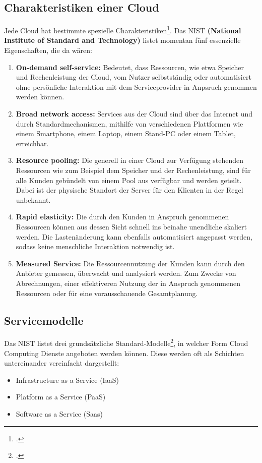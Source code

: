 \subsection{Charakteristiken einer Cloud}
Jede Cloud hat bestimmte spezielle Charakteristiken\footcite{cloud-computing}. Das NIST \textbf{(National Institute of Standard and Technology)} listet
momentan fünf essenzielle Eigenschaften, die da wären:
\begin{enumerate}
	\item \textbf{On-demand self-service: } Bedeutet, dass Ressourcen, wie etwa Speicher und Rechenleistung der Cloud, vom Nutzer selbstständig oder automatisiert 
ohne persönliche Interaktion mit dem Serviceprovider in Anpsruch genommen werden können.
	\item \textbf{Broad network access: } Services aus der Cloud sind über das Internet und durch Standardmechanismen, mithilfe von verschiedenen Plattformen wie einem Smartphone, einem Laptop, einem Stand-PC oder einem Tablet, erreichbar.
	\item \textbf{Resource pooling: } Die generell in einer Cloud zur Verfügung stehenden Ressourcen wie zum Beispiel dem Speicher und der Rechenleistung, sind für alle Kunden gebündelt von einem Pool aus verfügbar und werden geteilt. Dabei ist der physische Standort der Server für den Klienten in der Regel unbekannt.
	\item \textbf{Rapid elasticity: } Die durch den Kunden in Anspruch genommenen Ressourcen können aus dessen Sicht schnell ins beinahe unendliche skaliert werden. Die Lastenänderung
kann ebenfalls automatisiert angepasst werden, sodass keine menschliche Interaktion notwendig ist.
	\item \textbf{Measured Service: } Die Ressourcennutzung der Kunden kann durch den Anbieter gemessen, überwacht und analysiert werden. Zum Zwecke von Abrechnungen, einer effektiveren
Nutzung der in Anspruch genommenen Ressourcen oder für eine vorausschauende Gesamtplanung.
\end{enumerate}

\subsection{Servicemodelle}
Das NIST listet drei grundsätzliche Standard-Modelle\footcite{cloud-servicemodelle}, in welcher Form Cloud Computing Dienste angeboten werden können. Diese werden oft als Schichten untereinander vereinfacht dargestellt:
\begin{itemize}
	\item Infrastructure as a Service (IaaS)
	\item Platform as a Service (PaaS)
	\item Software as a Service (Saas)
\end{itemize}

